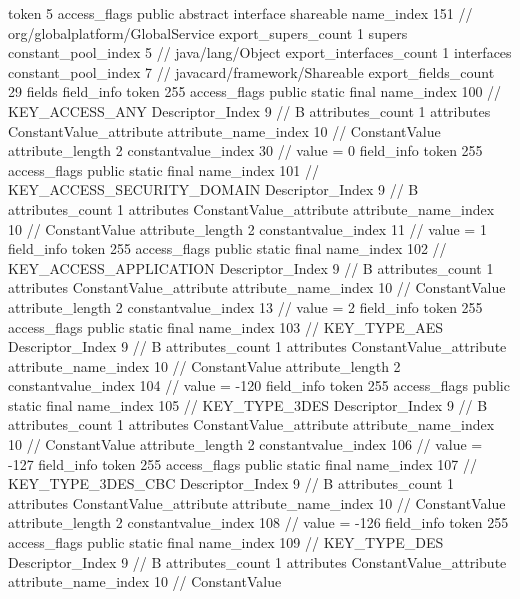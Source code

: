 {{{			token	5
			access_flags	public abstract interface shareable
			name_index	151		// org/globalplatform/GlobalService
			export_supers_count	1
			supers {
				constant_pool_index	5		// java/lang/Object
			}
			export_interfaces_count	1
			interfaces {
				constant_pool_index	7		// javacard/framework/Shareable
			}
			export_fields_count	29
			fields {
			field_info {
				token	255
				access_flags	public static final
				name_index	100		// KEY_ACCESS_ANY
				Descriptor_Index	9		// B
				attributes_count	1
				attributes {
				ConstantValue_attribute {
					attribute_name_index	10		// ConstantValue
					attribute_length	2
					constantvalue_index	30		// value = 0
				}
				}
			}
			field_info {
				token	255
				access_flags	public static final
				name_index	101		// KEY_ACCESS_SECURITY_DOMAIN
				Descriptor_Index	9		// B
				attributes_count	1
				attributes {
				ConstantValue_attribute {
					attribute_name_index	10		// ConstantValue
					attribute_length	2
					constantvalue_index	11		// value = 1
				}
				}
			}
			field_info {
				token	255
				access_flags	public static final
				name_index	102		// KEY_ACCESS_APPLICATION
				Descriptor_Index	9		// B
				attributes_count	1
				attributes {
				ConstantValue_attribute {
					attribute_name_index	10		// ConstantValue
					attribute_length	2
					constantvalue_index	13		// value = 2
				}
				}
			}
			field_info {
				token	255
				access_flags	public static final
				name_index	103		// KEY_TYPE_AES
				Descriptor_Index	9		// B
				attributes_count	1
				attributes {
				ConstantValue_attribute {
					attribute_name_index	10		// ConstantValue
					attribute_length	2
					constantvalue_index	104		// value = -120
				}
				}
			}
			field_info {
				token	255
				access_flags	public static final
				name_index	105		// KEY_TYPE_3DES
				Descriptor_Index	9		// B
				attributes_count	1
				attributes {
				ConstantValue_attribute {
					attribute_name_index	10		// ConstantValue
					attribute_length	2
					constantvalue_index	106		// value = -127
				}
				}
			}
			field_info {
				token	255
				access_flags	public static final
				name_index	107		// KEY_TYPE_3DES_CBC
				Descriptor_Index	9		// B
				attributes_count	1
				attributes {
				ConstantValue_attribute {
					attribute_name_index	10		// ConstantValue
					attribute_length	2
					constantvalue_index	108		// value = -126
				}
				}
			}
			field_info {
				token	255
				access_flags	public static final
				name_index	109		// KEY_TYPE_DES
				Descriptor_Index	9		// B
				attributes_count	1
				attributes {
				ConstantValue_attribute {
					attribute_name_index	10		// ConstantValue
}}}}}}}
